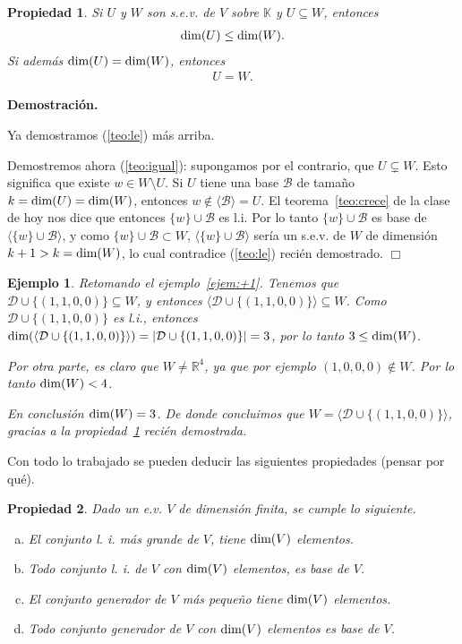 \documentclass[12pt]{book}
\newtheorem{prop}{Propiedad}
\newtheorem{ejem}{Ejemplo}
\def\R{\mathbb{R}}
\def\K{\mathbb{K}}
\def\B{\mathcal{B}}
\def\D{\mathcal{D}}
\def\dim{\textup{dim}}
\begin{document}
\begin{prop}\label{teo:leq}
  Si $U$ y $W$ son s.e.v. de $V$ sobre $\K$ y $U\subseteq W$, entonces
  \begin{eqnarray}\label{teo:le}
    \textup{dim}(U)\le \textup{dim}(W).
  \end{eqnarray} 
  Si además $\textup{dim}(U)=\textup{dim}(W)$, entonces
  \begin{eqnarray}\label{teo:igual}
    U=W.
  \end{eqnarray}
\end{prop}
    {\bf Demostración.} {
      Ya demostramos (\ref{teo:le}) más arriba.

      Demostremos ahora (\ref{teo:igual}): supongamos por el contrario, que $U\varsubsetneq W$.
      Esto significa que existe $w\in W\setminus U$.
      Si $U$ tiene una base $\B$ de tamaño $k=\dim(U)=\dim(W)$, entonces $w\not\in\langle\B\rangle=U$.
      El teorema~\ref{teo:crece} de la clase de hoy nos dice que entonces $\{w\}\cup\B$ es l.i.
      Por lo tanto $\{w\}\cup\B$ es base de $\langle\{w\}\cup\B\rangle$, y como $\{w\}\cup\B\subset W$, $\langle\{w\}\cup\B\rangle$ sería un s.e.v. de $W$ de dimensión $k+1>k=\dim(W)$, lo cual contradice (\ref{teo:le}) recién demostrado.
      \hfill $\Box$
    }

\begin{ejem} {\em
  Retomando el ejemplo~\ref{ejem:+1}.
  Tenemos que $\D\cup\{(1,1,0,0)\}\subseteq W$, y entonces $\langle\D\cup\{(1,1,0,0)\}\rangle\subseteq W$.
  Como $\D\cup\{(1,1,0,0)\}$ es l.i., entonces $\dim(\langle \D\cup\{(1,1,0,0)\}\rangle)=|\D\cup\{(1,1,0,0)\}|=3$, por lo tanto
  $3\le\dim(W)$.

  Por otra parte, es claro que $W\not=\R^4$, ya que por ejemplo $(1,0,0,0)\not\in W$.
  Por lo tanto $\dim(W)<4$.

  En conclusión $\dim(W)=3$.
  De donde concluimos que $W= \langle \D\cup\{(1,1,0,0)\}\rangle$, gracias a la propiedad~\ref{teo:leq} recién demostrada.
  }
\end{ejem}

Con todo lo trabajado se pueden deducir las siguientes propiedades (pensar por qué).

\begin{prop}\label{teo:general} Dado un e.v. $V$ de dimensión finita, se cumple lo siguiente.
\begin{enumerate}[a)]
\item El conjunto l. i. más grande de $V$, tiene $\textup{dim}(V)$ elementos.
\item Todo conjunto l. i. de $V$ con $\textup{dim}(V)$ elementos, es base de $V$.
\item El conjunto generador de $V$ más pequeño tiene $\textup{dim}(V)$ elementos.
\item Todo conjunto generador de $V$ con $\textup{dim}(V)$ elementos es base de $V$.
\end{enumerate}
\end{prop}
\end{document}

